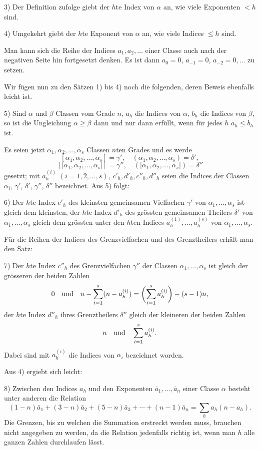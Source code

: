 3) Der Definition zufolge giebt der $h$te Index von $\alpha$ an, wie viele Exponenten $<h$ sind.

4) Umgekehrt giebt der $h$te Exponent von $\alpha$ an, wie viele Indices $\le h$ sind.

Man kann sich die Reihe der Indices $a_1,a_2,\ldots$ einer Classe auch nach der negativen Seite hin fortgesetzt denken. Es ist dann $a_0=0$, $a_{-1}=0$, $a_{-2}=0,\ldots$ zu setzen.

Wir fügen nun zu den Sätzen 1) bis 4) noch die folgenden, deren Beweis ebenfalls leicht ist.

5) Sind $\alpha$ und $\beta$ Classen vom Grade $n$, $a_h$ die Indices von $\alpha$, $b_h$ die Indices von $\beta$, so ist die Ungleichung $\alpha\ge\beta$ dann und nur dann erfüllt, wenn für jedes $h$ $a_h\le b_h$ ist.

Es seien jetzt $\alpha_1,\alpha_2,\ldots,\alpha_s$ Classen $n$ten Grades und es werde
\[
 [\alpha_1,\alpha_2,\ldots,\alpha_s]=\gamma',\quad
 (\alpha_1,\alpha_2,\ldots,\alpha_s)=\delta',
\]
\[
 [|\alpha_1,\alpha_2,\ldots,\alpha_s|]=\gamma'',\quad
 (|\alpha_1,\alpha_2,\ldots,\alpha_s|)=\delta''
\]
gesetzt; mit $a_h^{(i)}$ $(i=1,2,\ldots,s)$, $c'_h,d'_h,c''_h,d''_h$ seien die Indices der Classen $\alpha_i$, $\gamma'$, $\delta'$, $\gamma''$, $\delta''$ bezeichnet. Aus 5) folgt:

6) Der $h$te Index $c'_h$ des kleinsten gemeinsamen Vielfachen $\gamma'$ von $\alpha_1,\ldots,\alpha_s$ ist gleich dem kleinsten, der $h$te Index $d'_h$ des grössten gemeinsamen Theilers $\delta'$ von $\alpha_1,\ldots,\alpha_s$ gleich dem grössten unter den $h$ten Indices $a_h^{(1)},\ldots,a_h^{(s)}$ von $\alpha_1,\ldots,\alpha_s$.

Für die Reihen der Indices des Grenzvielfachen und des Grenztheilers erhält man den Satz:

7) Der $h$te Index $c''_h$ des Grenzvielfachen $\gamma''$ der Classen $\alpha_1,\ldots,\alpha_s$ ist gleich der grösseren der beiden Zahlen
\[
 0\quad\hbox{und}\quad n-\sum_{i=1}^s(n-a_h^{(i)})=\biggl(\sum_{i=1}^s a_h^{(i)}\biggr)-(s-1)n,
\]
der $h$te Index $d''_h$ ihres Grenztheilers $\delta''$ gleich der kleineren der beiden Zahlen
\[
 n\quad\hbox{und}\quad \sum_{i=1}^s a_h^{(i)}.
\]
Dabei sind mit $a_h^{(i)}$ die Indices von $\alpha_i$ bezeichnet worden.

Aus 4) ergiebt sich leicht:

8) Zwischen den Indices $a_h$ und den Exponenten $\bar a_1,\ldots,\bar a_n$ einer Classe $\alpha$ besteht unter anderen die Relation
\begin{equation}
 (1-n)\bar a_1+(3-n)\bar a_2+(5-n)\bar a_3+\cdots+(n-1)\bar a_n
 =\sum_h a_h(n-a_h).
\tag{3}
\end{equation}
Die Grenzen, bis zu welchen die Summation erstreckt werden muss, brauchen nicht angegeben zu werden, da die Relation jedenfalls richtig ist, wenn man $h$ alle ganzen Zahlen durchlaufen lässt.


